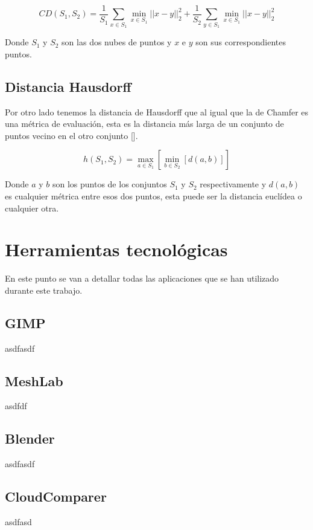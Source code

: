 \begin{equation}
	\label{eq:6}
	CD(S_{1}, S_{2}) = 
	\frac{1}{S_{1}} \sum_{x \in S_{1}}{} \min_{x \in S_1}|| x - y ||_{2}^{2} +
	\frac{1}{S_{2}} \sum_{y \in S_{1}}{} \min_{x \in S_1}|| x - y ||_{2}^{2}
\end{equation}

Donde $S_{1}$ y $S_{2}$ son las dos nubes de puntos y $x$ e $y$ son sus correspondientes puntos.

\subsection{Distancia Hausdorff}
Por otro lado tenemos la distancia de Hausdorff que al igual que la de Chamfer es una métrica de evaluación, esta es la distancia más larga de un conjunto de puntos vecino en el otro conjunto [\cite{grégoire_bouillot_2022}].

\begin{equation}
	\label{eq:7}
	h(S_{1}, S_{2}) = 
	\max_{a \in S_{1}} [ \min_{b \in S_{2}} [d(a,b)]]
\end{equation}

Donde $a$ y $b$ son los puntos de los conjuntos $S_{1}$ y $S_{2}$ respectivamente y $d(a,b)$ es cualquier métrica entre esos dos puntos, esta puede ser la distancia euclídea o cualquier otra.

\section{Herramientas tecnológicas}

En este punto se van a detallar todas las aplicaciones que se han utilizado durante este trabajo.

\subsection{GIMP}
asdfasdf

\subsection{MeshLab}
asdfdf
\subsection{Blender}
asdfasdf
\subsection{CloudComparer}
asdfasd

